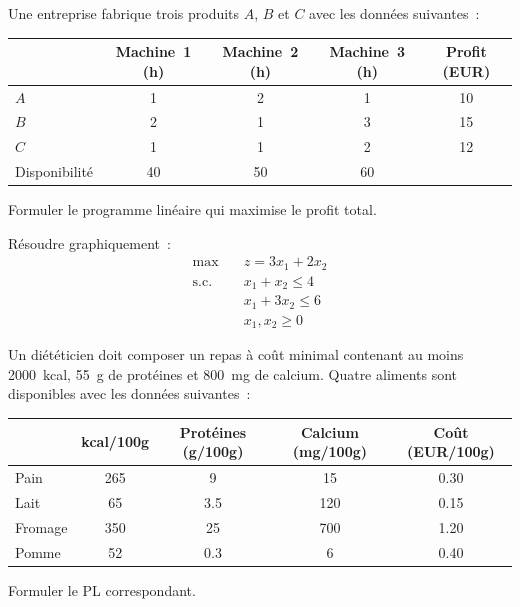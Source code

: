 \begin{exercice}
Une entreprise fabrique trois produits $A$, $B$ et $C$ avec les donn\'ees
suivantes~:

\begin{center}
\begin{tabular}{lcccc}
  \toprule
  & Machine~1 (h) & Machine~2 (h) & Machine~3 (h) & Profit (EUR) \\
  \midrule
  $A$ & 1 & 2 & 1 & 10 \\
  $B$ & 2 & 1 & 3 & 15 \\
  $C$ & 1 & 1 & 2 & 12 \\
  \midrule
  Disponibilit\'e & 40 & 50 & 60 & \\
  \bottomrule
\end{tabular}
\end{center}

Formuler le programme lin\'eaire qui maximise le profit total.
\end{exercice}

\begin{exercice}
R\'esoudre graphiquement~:
\[
\begin{aligned}
  \max \quad & z = 3x_1 + 2x_2 \\
  \text{s.c.} \quad
    & x_1 + x_2 \le 4 \\
    & x_1 + 3x_2 \le 6 \\
    & x_1, x_2 \ge 0
\end{aligned}
\]
\end{exercice}

\begin{exercice}
Un di\'et\'eticien doit composer un repas \`a co\^ut minimal contenant au moins
2000~kcal, 55~g de prot\'eines et 800~mg de calcium.  Quatre aliments sont
disponibles avec les donn\'ees suivantes~:

\begin{center}
\begin{tabular}{lcccc}
  \toprule
  & kcal/100g & Prot\'eines (g/100g) & Calcium (mg/100g) & Co\^ut (EUR/100g) \\
  \midrule
  Pain & 265 & 9 & 15 & 0.30 \\
  Lait & 65 & 3.5 & 120 & 0.15 \\
  Fromage & 350 & 25 & 700 & 1.20 \\
  Pomme & 52 & 0.3 & 6 & 0.40 \\
  \bottomrule
\end{tabular}
\end{center}

Formuler le PL correspondant.
\end{exercice}

